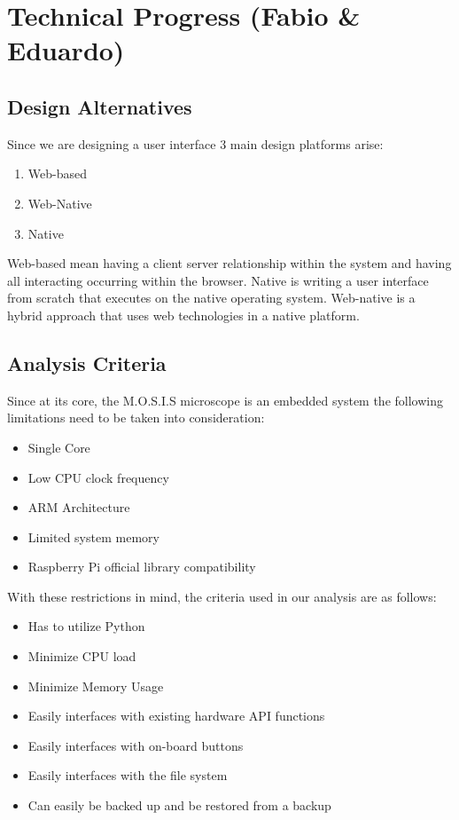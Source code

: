 \section{Technical Progress (Fabio \& Eduardo)}
\subsection{Design Alternatives}
Since we are designing a user interface 3 main design platforms arise:
\begin{enumerate}
	\item Web-based
	\item Web-Native
	\item Native
\end{enumerate}
Web-based mean having a client server relationship within the system and having all interacting occurring within the browser.
Native is writing a user interface from scratch that executes on the native operating system.
Web-native is a hybrid approach that uses web technologies in a native platform.
\subsection{Analysis Criteria}
Since at its core, the M.O.S.I.S microscope is an embedded system the following limitations need to be taken into consideration:
\begin{itemize}
	\item Single Core
	\item Low CPU clock frequency
	\item ARM Architecture
	\item Limited system memory
	\item Raspberry Pi official library compatibility
\end{itemize}
With these restrictions in mind, the criteria used in our analysis are as follows:
\begin{itemize}
	\item Has to utilize Python
	\item Minimize CPU load
	\item Minimize Memory Usage
	\item Easily interfaces with existing hardware API functions
	\item Easily interfaces with on-board buttons
	\item Easily interfaces with the file system
	\item Can easily be backed up and be restored from a backup
\end{itemize}
